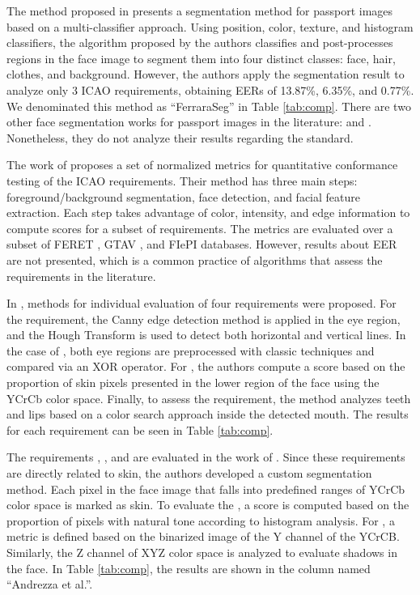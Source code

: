 The method proposed in \cite{ferrara2012multi} presents a segmentation method for passport images based on a multi-classifier approach. Using position, color, texture, and histogram classifiers, the algorithm proposed by the authors classifies and post-processes regions in the face image to segment them into four distinct classes: face, hair, clothes, and background. However, the authors apply the segmentation result to analyze only 3 ICAO requirements, obtaining EERs of 13.87\%, 6.35\%, and 0.77\%. We denominated this method as ``FerraraSeg'' in Table \ref{tab:comp}. There are two other face segmentation works for passport images in the literature: \cite{hirzer2009automatic} and \cite{subasic2009expert}. Nonetheless, they do not analyze their results regarding the \icao standard.

The work of \citet{nguyen2013automated} proposes a set of normalized metrics for quantitative conformance testing of the ICAO requirements. Their method has three main steps: foreground/background segmentation, face detection, and facial feature extraction. Each step takes advantage of color, intensity, and edge information to compute scores for a subset of requirements. The metrics are evaluated over a subset of FERET \citep{phillips1998feret}, GTAV \citep{tarres2012gtav}, and FIePI databases. However, results about EER are not presented, which is a common practice of algorithms that assess the \icao requirements in the literature.

In \cite{parente2016assessing}, methods for individual evaluation of four requirements were proposed. For the \citeReq{\pixelation} requirement, the Canny edge detection method is applied in the eye region, and the Hough Transform is used to detect both horizontal and vertical lines. In the case of \citeReq{\hairacrosseyes}, both eye regions are preprocessed with classic techniques and compared via an XOR operator. For \citeReq{\veiloverface}, the authors compute a score based on the proportion of skin pixels presented in the lower region of the face using the YCrCb color space. Finally, to assess the \citeReq{\mouthopen} requirement, the method analyzes teeth and lips based on a color search approach inside the detected mouth. The results for each requirement can be seen in Table \ref{tab:comp}.

The requirements \citeReq{\unnaturalskintone}, \citeReq{\shadowsacrossface}, and \citeReq{\flashskin} are evaluated in the work of \citet{andrezza2016facial}. Since these requirements are directly related to skin, the authors developed a custom segmentation method. Each pixel in the face image that falls into predefined ranges of YCrCb color space is marked as skin. To evaluate the \citeReq{\unnaturalskintone}, a score is computed based on the proportion of pixels with natural tone according to histogram analysis. For \citeReq{\flashskin}, a metric is defined based on the binarized image of the Y channel of the YCrCB. Similarly, the Z channel of XYZ color space is analyzed to evaluate shadows in the face. In Table \ref{tab:comp}, the results are shown in the column named ``Andrezza et al.''.

